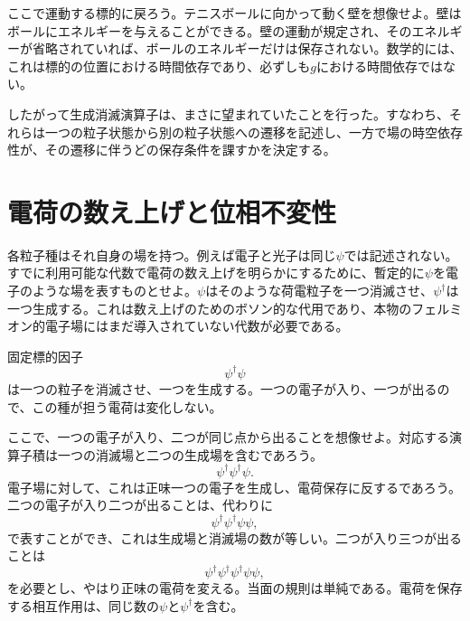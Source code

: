 \begin{classroomqa}
\end{classroomqa}

ここで運動する標的に戻ろう。テニスボールに向かって動く壁を想像せよ。壁はボールにエネルギーを与えることができる。壁の運動が規定され、そのエネルギーが省略されていれば、ボールのエネルギーだけは保存されない。数学的には、これは標的の位置における時間依存であり、必ずしも\(g\)における時間依存ではない。

したがって生成消滅演算子は、まさに望まれていたことを行った。すなわち、それらは一つの粒子状態から別の粒子状態への遷移を記述し、一方で場の時空依存性が、その遷移に伴うどの保存条件を課すかを決定する。

\section{電荷の数え上げと位相不変性}

各粒子種はそれ自身の場を持つ。例えば電子と光子は同じ\(\psi\)では記述されない。すでに利用可能な代数で電荷の数え上げを明らかにするために、暫定的に\(\psi\)を電子のような場を表すものとせよ。\(\psi\)はそのような荷電粒子を一つ消滅させ、\(\psi^\dagger\)は一つ生成する。これは数え上げのためのボソン的な代用であり、本物のフェルミオン的電子場にはまだ導入されていない代数が必要である。

固定標的因子
\begin{equation}
\psi^\dagger\psi
\end{equation}
は一つの粒子を消滅させ、一つを生成する。一つの電子が入り、一つが出るので、この種が担う電荷は変化しない。

ここで、一つの電子が入り、二つが同じ点から出ることを想像せよ。対応する演算子積は一つの消滅場と二つの生成場を含むであろう。
\begin{equation}
\psi^\dagger\psi^\dagger\psi.
\end{equation}
電子場に対して、これは正味一つの電子を生成し、電荷保存に反するであろう。二つの電子が入り二つが出ることは、代わりに
\begin{equation}
\psi^\dagger\psi^\dagger\psi\psi,
\end{equation}
で表すことができ、これは生成場と消滅場の数が等しい。二つが入り三つが出ることは
\begin{equation}
\psi^\dagger\psi^\dagger\psi^\dagger\psi\psi,
\end{equation}
を必要とし、やはり正味の電荷を変える。当面の規則は単純である。電荷を保存する相互作用は、同じ数の\(\psi\)と\(\psi^\dagger\)を含む。

